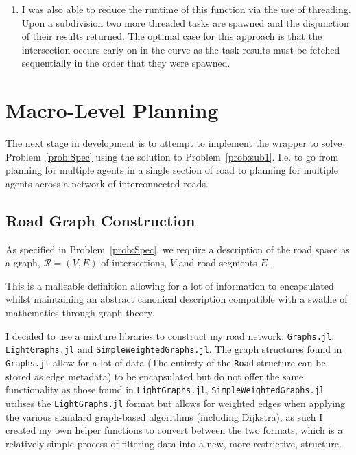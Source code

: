 \begin{enumerate}
  \item I was also able to reduce the runtime of this function via the use of threading. Upon a subdivision two more threaded tasks are spawned and the disjunction of their results returned. The optimal case for this approach is that the intersection occurs early on in the curve as the task results must be fetched sequentially in the order that they were spawned. 

\end{enumerate}

\section{Macro-Level Planning} 

The next stage in development is to attempt to implement the wrapper to solve Problem~\ref{prob:Spec} using the solution to Problem~\ref{prob:sub1}. I.e. to go from planning for multiple agents in a single section of road to planning for multiple agents across a network of interconnected roads.

\subsection{Road Graph Construction }

As specified in Problem~\ref{prob:Spec}, we require a description of the road space as a graph, $\mathcal{R}= (V,E)$ of intersections, $V$ and road segments $E$
.

This is a malleable definition allowing for a lot of information to encapsulated whilst maintaining an abstract canonical description compatible with a swathe of mathematics through graph theory.

I decided to use a mixture libraries to construct my road network: \texttt{Graphs.jl}\cite{JuliaAtticGraphsJl2021}, \texttt{LightGraphs.jl}\cite{Bromberger17}  and \texttt{SimpleWeightedGraphs.jl}\cite{JuliaGraphsSimpleWeightedGraphsJl2021}. The graph structures found in \texttt{Graphs.jl} allow for a lot of data (The entirety of the \texttt{Road} structure can be stored as edge metadata) to be encapsulated but do not offer the same functionality as those found in \texttt{LightGraphs.jl}, \texttt{SimpleWeightedGraphs.jl} utilises the \texttt{LightGraphs.jl} format but allows for weighted edges when applying the various standard graph-based algorithms (including Dijkstra), as such I created my own helper functions to convert between the two formats, which is a relatively simple process of filtering data into a new, more restrictive, structure.

